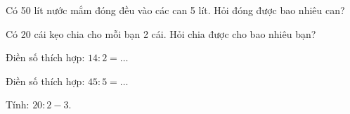 \begin{ex}
Có 50 lít nước mắm đóng đều vào các can 5 lít. Hỏi đóng được bao nhiêu can?
\end{ex}

\begin{ex}
Có 20 cái kẹo chia cho mỗi bạn 2 cái. Hỏi chia được cho bao nhiêu bạn?
\end{ex}

\begin{ex}
Điền số thích hợp: $14 : 2 = \dots$
\end{ex}

\begin{ex}
Điền số thích hợp: $45 : 5 = \dots$
\end{ex}

\begin{ex}
Tính: $20 : 2 - 3$.
\end{ex}

